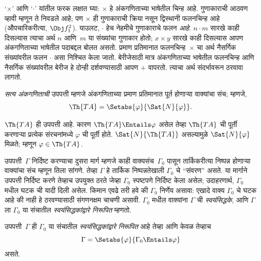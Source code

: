 `$\times$' आणि `$\cdot$' यांतील फरक लक्षात घ्या: $\times$ हे
अंकगणिताच्या भाषेतील चिन्ह आहे. गुणाकाराची आठवण व्हावी म्हणून ते
निवडले आहे; पण $\times$ ही गुणाकाराची क्रिया नसून द्विस्थानी फलनचिन्ह
आहे (औपचारिकरीत्या, $\Obj f^2_1$). याउलट, $\cdot$ हेच नेहमीचे
गुणाकाराचे फलन \emph{आहे}. $n \cdot m$ सारखे काही दिसल्यास त्याचा
अर्थ $n$ आणि~$m$ या संख्यांचा गुणाकार होतो; $x \times y$ सारखे
काही दिसल्यास आपण अंकगणिताच्या भाषेतील पदाबद्दल बोलत असतो. प्रमाण
प्रतिमानात फलनचिन्ह~$\times$ चा अर्थ नैसर्गिक संख्यांवरील फलन
$\cdot$ असा निश्चित केला जातो. बेरीजेसाठी मात्र अंकगणिताच्या
भाषेतील फलनचिन्ह आणि नैसर्गिक संख्यांवरील बेरीज हे दोन्ही दर्शवण्यासाठी
आपण $+$ वापरतो. त्याचा अर्थ संदर्भावरून ठरवावा लागतो.

\begin{defn}
\emph{सत्य अंकगणिताची} उपपत्ती म्हणजे अंकगणिताच्या प्रमाण प्रतिमानात
पूर्त होणाऱ्या वाक्यांचा संच; म्हणजे,
\[\Th{TA} = \Setabs{\varphi}{\Sat{N}{\varphi}}.
\]
\end{defn}

$\Th{TA}$ ही उपपत्ती आहे. कारण $\Th{TA} \Entails \varphi$ असेल तेव्हा
$\Th{TA}$ ची पूर्ती करणाऱ्या प्रत्येक संरचनांमध्ये $\varphi$ ची
पूर्ती होते. $\Sat{N}{\Th{TA}}$ असल्यामुळे $\Sat{N}{\varphi}$ मिळते;
म्हणून $\varphi \in \Th{TA}$.

उपपत्ती~$\Gamma$ निर्दिष्ट करण्याचा दुसरा मार्ग म्हणजे काही
वाक्यसंच~$\Gamma_0$ पासून तार्किकरीत्या निष्पन्न होणाऱ्या
वाक्यांचा संच म्हणून तिला सांगणे. तेव्हा $\Gamma$ हे
तार्किक निष्पन्नतेखाली $\Gamma_0$ चे ``संवरण'' असते. या मार्गाने उपपत्ती निर्दिष्ट करणे तेव्हाच
उपयुक्त ठरते जेव्हा $\Gamma_0$ स्पष्टपणे निर्दिष्ट केला असेल;
उदाहरणार्थ, $\Gamma_0$ मधील घटक ची यादी दिली असेल.
किमान एवढे तरी हवे की $\Gamma_0$ निर्णेय असावा: एखादे
वाक्य $\Gamma_0$ चे घटक आहे की नाही हे ठरवण्यासाठी
संगणनक्षम चाचणी असावी. $\Gamma_0$ मधील वाक्यांना
$\Gamma$ ची \emph{स्वयंसिद्धके}, आणि $\Gamma$ ला
$\Gamma_0$ या संचातील \emph{स्वयंसिद्धकांद्वारे निरूपित} म्हणतो.

\begin{defn}
उपपत्ती~$\Gamma$ ही $\Gamma_0$ या संचातील
\emph{स्वयंसिद्धकांद्वारे निरूपित} आहे तेव्हा आणि केवळ तेव्हाच
\[\Gamma = \Setabs{\varphi}{\Gamma_0 \Entails \varphi}
\]
असते.
\end{defn}

